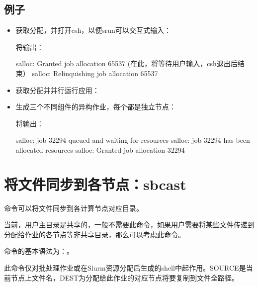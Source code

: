 \subsection{例子}
\begin{itemize}
	\item 获取分配，并打开csh，以便srun可以交互式输入：


将输出：
\begin{OUT}
salloc: Granted job allocation 65537
(在此，将等待用户输入，csh退出后结束）
salloc: Relinquishing job allocation 65537
\end{OUT}
	\item 获取分配并并行运行应用：

	\item 生成三个不同组件的异构作业，每个都是独立节点：


将输出：
\begin{OUT}
salloc: job 32294 queued and waiting for resources
salloc: job 32294 has been allocated resources
salloc: Granted job allocation 32294
\end{OUT}
\end{itemize}

\section{将文件同步到各节点：sbcast}
命令可以将文件同步到各计算节点对应目录。

当前，用户主目录是共享的，一般不需要此命令，如果用户需要将某些文件传递到分配给作业的各节点等非共享目录，那么可以考虑此命令。

命令的基本语法为：。

此命令仅对批处理作业或在Slurm资源分配后生成的shell中起作用。SOURCE是当前节点上文件名，DEST为分配给此作业的对应节点将要复制到文件全路径。


